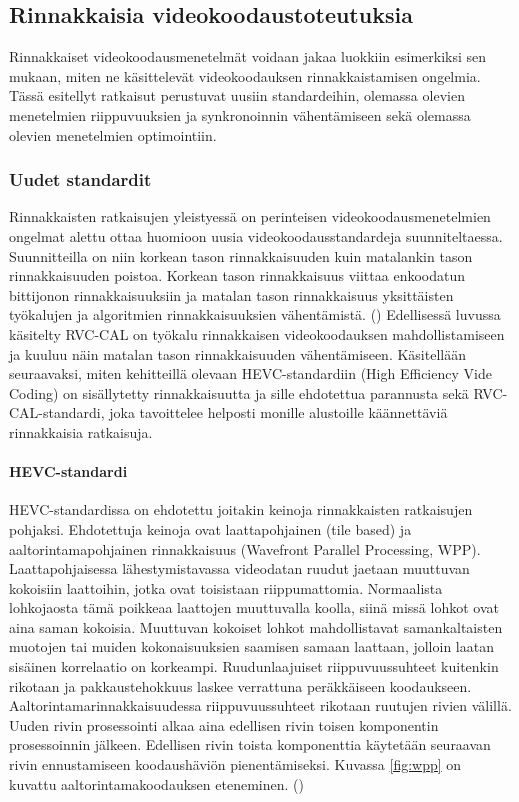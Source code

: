 \subsection{Rinnakkaisia videokoodaustoteutuksia}

Rinnakkaiset videokoodausmenetelmät voidaan jakaa luokkiin esimerkiksi sen
mukaan, miten ne käsittelevät videokoodauksen rinnakkaistamisen ongelmia.
Tässä esitellyt ratkaisut perustuvat uusiin standardeihin, olemassa olevien
menetelmien riippuvuuksien ja synkronoinnin
vähentämiseen sekä olemassa olevien menetelmien optimointiin.

\subsubsection{Uudet standardit}

Rinnakkaisten ratkaisujen yleistyessä on perinteisen videokoodausmenetelmien
ongelmat alettu ottaa huomioon uusia
videokoodausstandardeja suunniteltaessa. Suunnitteilla on niin korkean
tason rinnakkaisuuden kuin matalankin tason rinnakkaisuuden poistoa. Korkean
tason rinnakkaisuus viittaa enkoodatun bittijonon rinnakkaisuuksiin ja matalan
tason rinnakkaisuus yksittäisten työkalujen ja algoritmien rinnakkaisuuksien
vähentämistä. (\citealt{choi}) Edellisessä luvussa käsitelty RVC-CAL on työkalu
rinnakkaisen videokoodauksen mahdollistamiseen ja kuuluu näin matalan tason rinnakkaisuuden
vähentämiseen.
Käsitellään seuraavaksi, miten kehitteillä
olevaan HEVC-standardiin (High Efficiency Vide Coding) on sisällytetty rinnakkaisuutta ja sille ehdotettua
parannusta sekä RVC-CAL-standardi, joka tavoittelee helposti monille alustoille
käännettäviä rinnakkaisia ratkaisuja.

\setcounter{secnumdepth}{5}

\paragraph{HEVC-standardi}

HEVC-standardissa on ehdotettu joitakin keinoja rinnakkaisten
ratkaisujen pohjaksi. Ehdotettuja keinoja ovat laattapohjainen (tile based) ja
aaltorintamapohjainen rinnakkaisuus (Wavefront Parallel Processing, WPP).
Laattapohjaisessa lähestymistavassa videodatan ruudut jaetaan muuttuvan
kokoisiin laattoihin, jotka ovat toisistaan riippumattomia. Normaalista
lohkojaosta tämä poikkeaa laattojen muuttuvalla koolla, siinä missä lohkot
ovat aina saman kokoisia. Muuttuvan kokoiset lohkot mahdollistavat
samankaltaisten muotojen tai muiden kokonaisuuksien saamisen samaan laattaan,
jolloin laatan sisäinen korrelaatio on korkeampi. Ruudunlaajuiset
riippuvuussuhteet kuitenkin rikotaan ja pakkaustehokkuus laskee verrattuna
peräkkäiseen koodaukseen. Aaltorintamarinnakkaisuudessa riippuvuussuhteet
rikotaan ruutujen rivien välillä. Uuden rivin prosessointi alkaa aina edellisen
rivin toisen komponentin prosessoinnin jälkeen. Edellisen rivin toista
komponenttia käytetään seuraavan rivin ennustamiseen koodaushäviön
pienentämiseksi. Kuvassa \ref{fig:wpp} on kuvattu aaltorintamakoodauksen
eteneminen. (\citealt{chi})

